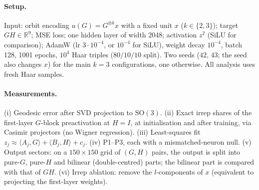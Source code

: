 \documentclass[a4paper,11pt]{article}
\theoremstyle{remark}
\theoremstyle{definition}
\newcommand{\R}{\mathbb{R}}
\newcommand{\SO}{\mathrm{SO}(3)}
\newcommand{\ip}[2]{\langle #1, #2 \rangle}
\begin{document}
\paragraph{Setup.} Input: orbit encoding $u(G)=G^{\otimes k}x$ with a fixed
unit $x$ ($k\in\{2,3\}$); target $GH\in\R^9$; MSE loss; one hidden layer of
width 2048; activation $z^2$ (SiLU for comparison); AdamW (lr $3\cdot10^{-4}$,
or $10^{-4}$ for SiLU), weight decay $10^{-4}$, batch 128, 1001 epochs,
$10^4$ Haar triples ($80/10/10$ split). Two seeds ($42$, $43$; the seed also
changes $x$) for the main $k=3$ configurations, one otherwise. All analysis
uses fresh Haar samples.

\paragraph{Measurements.}
(i) Geodesic error after SVD projection to $\SO$. (ii) Exact irrep shares of
the first-layer $G$-block preactivation at $H=I$, at initialisation and after
training, via Casimir projectors (no Wigner regression). (iii) Least-squares
fit $z_j\approx\ip{A_j}{G}+\ip{B_j}{H}+c_j$. (iv) P1--P3, each with a
mismatched-neuron null. (v) Output sectors: on a $150\times150$ grid of $(G,H)$
pairs, the output is split into pure-$G$, pure-$H$ and bilinear
(double-centred) parts; the bilinear part is compared with that of $GH$.
(vi) Irrep ablation: remove the $l$-components of $x$ (equivalent to projecting
the first-layer weights).

\begin{table}[h]
\centering\small
{}
\caption{Matrix target $GH$. Chance geodesic error is $126.5^\circ$. Shares are
of the first-layer $G$-block (the $H$-block agrees to $\pm0.01$). P1 is the
readout cosine weighted by $\|r_j\|\|A_jB_j\|$; nulls pair neuron $j$ with
another neuron's quantities.}
\label{tab:main}
\end{table}
\end{document}

